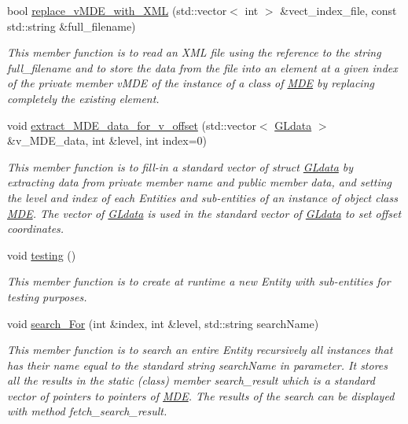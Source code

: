 \begin{DoxyCompactItemize}
bool \hyperlink{group__group__io_gaa51327a2747fbef6e85da046e7661a2e}{replace\+\_\+v\+M\+D\+E\+\_\+with\+\_\+\+X\+ML} (std\+::vector$<$ int $>$ \&vect\+\_\+index\+\_\+file, const std\+::string \&full\+\_\+filename)
\begin{DoxyCompactList}\small\item\em This member function is to read an X\+ML file using the reference to the string full\+\_\+filename and to store the data from the file into an element at a given index of the private member v\+M\+DE of the instance of a class of \hyperlink{classMDE}{M\+DE} by replacing completely the existing element. \end{DoxyCompactList}\item 
void \hyperlink{group__group__io_gad5a5a84a32ba35ff2c35f3a60fb2c44f}{extract\+\_\+\+M\+D\+E\+\_\+data\+\_\+for\+\_\+v\+\_\+offset} (std\+::vector$<$ \hyperlink{structGLdata}{G\+Ldata} $>$ \&v\+\_\+\+M\+D\+E\+\_\+data, int \&level, int index=0)
\begin{DoxyCompactList}\small\item\em This member function is to fill-\/in a standard vector of struct \hyperlink{structGLdata}{G\+Ldata} by extracting data from private member \textquotesingle{}name\textquotesingle{} and public member \textquotesingle{}data\textquotesingle{}, and setting the level and index of each Entities and sub-\/entities of an instance of object class \hyperlink{classMDE}{M\+DE}. The vector of \hyperlink{structGLdata}{G\+Ldata} is used in the standard vector of \hyperlink{structGLdata}{G\+Ldata} to set offset coordinates. \end{DoxyCompactList}\item 
void \hyperlink{group__group__testing_ga06c00f993c0b3069376b762aeb731d9b}{testing} ()
\begin{DoxyCompactList}\small\item\em This member function is to create at runtime a new Entity with sub-\/entities for testing purposes. \end{DoxyCompactList}\item 
void \hyperlink{group__group__search_ga265f4aa5242e6380380067d659ada5c1}{search\+\_\+\+For} (int \&index, int \&level, std\+::string search\+Name)
\begin{DoxyCompactList}\small\item\em This member function is to search an entire Entity recursively all instances that has their name equal to the standard string search\+Name in parameter. It stores all the results in the static (class) member search\+\_\+result which is a standard vector of pointers to pointers of \hyperlink{classMDE}{M\+DE}. The results of the search can be displayed with method fetch\+\_\+search\+\_\+result. \end{DoxyCompactList}\item 

\end{DoxyCompactItemize}
